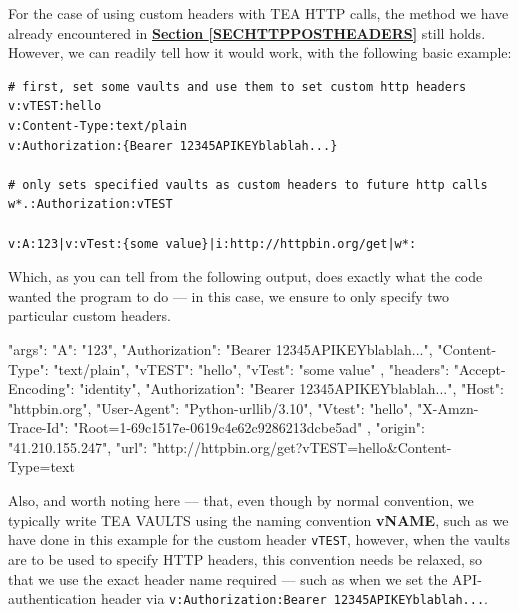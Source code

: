 \documentclass[a4paper, 18pt]{book} %
\begin{document}
{{{For the case of using custom headers with TEA HTTP calls, the method we have already encountered in \textbf{\hyperref[SECHTTPPOSTHEADERS]{Section \ref{SECHTTPPOSTHEADERS}}} still holds. However, we can readily tell how it would work, with the following basic example:


  \vspace{2em}

  \begin{tcolorbox}[teaterminalstyle, title=W: EXAMPLE 12: A Simple HTTP GET -  with Custom HTTP Headers, breakable]
  \begin{lstlisting}[language=TEA,breaklines=true,]
# first, set some vaults and use them to set custom http headers
v:vTEST:hello
v:Content-Type:text/plain
v:Authorization:{Bearer 12345APIKEYblablah...}

# only sets specified vaults as custom headers to future http calls
w*.:Authorization:vTEST 

v:A:123|v:vTest:{some value}|i:http://httpbin.org/get|w*:
   \end{lstlisting}
  \end{tcolorbox}

\vspace{1em}


Which, as you can tell from the following output, does exactly what the code wanted the program to do --- in this case, we ensure to only specify two particular custom headers.


 \vspace{2em}
 \begin{tcbverbatim}[title=Sample OUTPUT 12 from EXAMPLE 12]
{
  "args": {
    "A": "123",
    "Authorization": "Bearer 12345APIKEYblablah...",
    "Content-Type": "text/plain",
    "vTEST": "hello",
    "vTest": "some value"
  },
  "headers": {
    "Accept-Encoding": "identity",
    "Authorization": "Bearer 12345APIKEYblablah...",
    "Host": "httpbin.org",
    "User-Agent": "Python-urllib/3.10",
    "Vtest": "hello",
    "X-Amzn-Trace-Id": "Root=1-69c1517e-0619c4e62c9286213dcbe5ad"
  },
  "origin": "41.210.155.247",
  "url": "http://httpbin.org/get?vTEST=hello&Content-Type=text%
}
  \end{tcbverbatim}
 \vspace{2em} 
 

Also, and worth noting here --- that, even though by normal convention, we typically write TEA VAULTS using the naming convention \textbf{vNAME}, such as we have done in this example for the custom header \texttt{vTEST}, however, when the vaults are to be used to specify HTTP headers, this convention needs be relaxed, so that we use the exact header name required --- such as when we set the API-authentication header via \texttt{v:Authorization:{Bearer 12345APIKEYblablah...}}.

}}}
\end{document}
